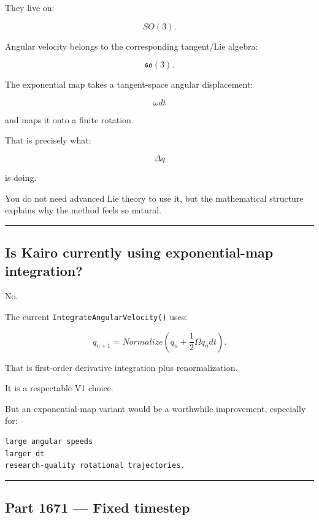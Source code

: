 They live on:

\[
SO(3).
\]

Angular velocity belongs to the corresponding tangent/Lie algebra:

\[
\mathfrak{so}(3).
\]

The exponential map takes a tangent-space angular displacement:

\[
\omega dt
\]

and maps it onto a finite rotation.

That is precisely what:

\[
\Delta q
\]

is doing.

You do not need advanced Lie theory to use it, but the mathematical structure explains why the method feels so natural.

\begin{center}\rule{0.5\linewidth}{0.5pt}\end{center}

\subsection{Is Kairo currently using exponential-map integration?}\label{06-engine-ii-ch037-is-kairo-currently-using-exponential-map-integration}

\hypertarget{06-engine-ii-ch037-is-kairo-currently-using-exponential-map-integration}{}

No.

The current \texttt{IntegrateAngularVelocity()} uses:

\[
q_{n+1}
=
Normalize(
q_n+
\frac12\Omega q_n dt
).
\]

That is first-order derivative integration plus renormalization.

It is a respectable V1 choice.

But an exponential-map variant would be a worthwhile improvement, especially for:

\begin{verbatim}
large angular speeds
larger dt
research-quality rotational trajectories.
\end{verbatim}

\begin{center}\rule{0.5\linewidth}{0.5pt}\end{center}

\subsection{Part 1671 --- Fixed timestep}\label{06-engine-ii-ch037-part-1671-fixed-timestep}

